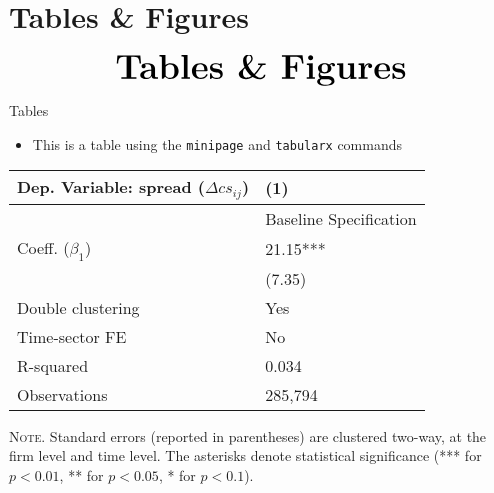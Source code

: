\documentclass[10pt]{beamer}
\begin{document}

\section{Tables \& Figures}
\begin{frame}
	\begin{eqnarray*}
		&\text{{\Huge \textbf{Tables \& Figures}}}\\
	\end{eqnarray*}
\end{frame}


\begin{frame}
	{Tables}
	\begin{itemize}
		\item This is a table using the \texttt{minipage} and \texttt{tabularx} commands
	\end{itemize}
	\begin{table}[th]
		\centering%
		\begin{minipage}[b]{.5\textwidth}
			\vspace{.2cm}\tablesize
			\begin{tabularx}{\textwidth}{lY}
				\toprule
				Dep. Variable: spread ($\Delta cs_{ij}$) 	& (1)\\
				\midrule
				& {Baseline Specification} \\
				\midrule
				 Coeff. ($\beta_1$) 		&  21.15*** \\
				&   (7.35) \\
				\midrule
				 Double clustering 		& Yes \\
				Time-sector FE 												& No \\
				 R-squared 					& 0.034 \\
				Observations 												& 285,794 \\\bottomrule
			\end{tabularx}\vspace{.2cm}\newline
			\tiny{{\scshape Note.} Standard errors (reported in parentheses) are clustered two-way, at the firm level and time level. The asterisks denote statistical significance (*** for $p<0.01$, ** for $p<0.05$, * for $p<0.1$).\newline}%
			\label{tab:label}%
		\end{minipage}
	\end{table}
\end{frame}
\end{document}
